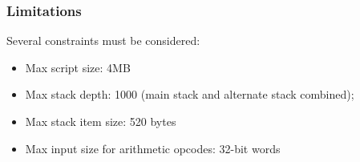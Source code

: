 \subsubsection{Limitations}

Several constraints must be considered:
\begin{itemize}
    \item Max script size: 4MB
    \item Max stack depth: 1000 (main stack and alternate stack combined);
    \item Max stack item size: 520 bytes
    \item Max input size for arithmetic opcodes: 32-bit words
\end{itemize}
